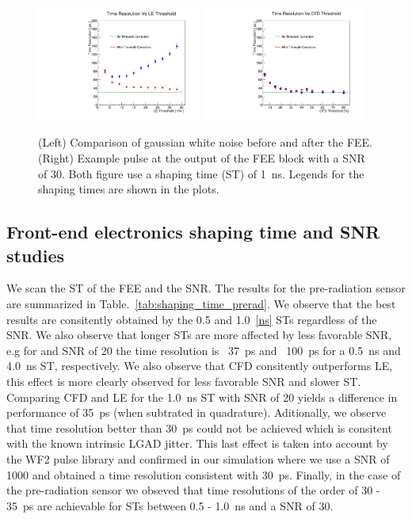 \documentclass[preprint,1p]{elsarticle}
\begin{document}
\begin{figure}[htbp]
  \centering
  \includegraphics[width=0.48\textwidth]{figs/ShapingTime1p0_SNR30_55MicronGain15Prerad_FIXED_NOISE_FIXED_SNR_V2_converted_TimeResolutionVsThresholdToT.pdf} \hfill
  \includegraphics[width=0.48\textwidth]{figs/ShapingTime1p0_SNR30_55MicronGain15Prerad_FIXED_NOISE_FIXED_SNR_V2_converted_TimeResolutionVsThresholdCFD.pdf}
  \caption{(Left) Comparison of gaussian white noise before and after the FEE.
  (Right) Example pulse at the output of the FEE block with a SNR of 30. Both figure use a shaping time (ST) of 1~\si{ns}. Legends for the shaping times are shown in the plots.}
  \label{fig:time_resolution_scan}
\end{figure}

\subsection{Front-end electronics shaping time and SNR studies}\label{sec:shaping_time}
We scan the ST of the FEE and the SNR. The results for the pre-radiation sensor are summarized in Table.~\ref{tab:shaping_time_prerad}.
 We observe that the best results are consitently obtained by the 0.5 and 1.0~\ref{ns} STs regardless of the SNR. We also observe that
 longer STs are more affected by less favorable SNR, e.g for and SNR of 20 the time resolution is ~37~\si{ps} and ~100~\si{ps} for a
 0.5~\si{ns} and 4.0~\si{ns} ST, respectively. We also observe that CFD consitently outperforms LE, this effect is more clearly observed
 for less favorable SNR and slower ST. Comparing CFD and LE for the 1.0~\si{ns} ST with SNR of 20 yields a difference in performance of
 35~\si{ps} (when subtrated in quadrature). Aditionally, we observe that time resolution better than 30~\si{ps} could not be achieved which
 is consitent with the known intrinsic LGAD jitter. This last effect is taken into account by the WF2 pulse library and confirmed in our
 simulation where we use a SNR of 1000 and obtained a time resolution consistent with 30~\si{ps}. Finally, in the case of the pre-radiation sensor
 we obseved that time resolutions of the order of 30 - 35~\si{ps} are achievable for STs between 0.5 - 1.0~\si{ns} and a SNR of 30.
\end{document}
